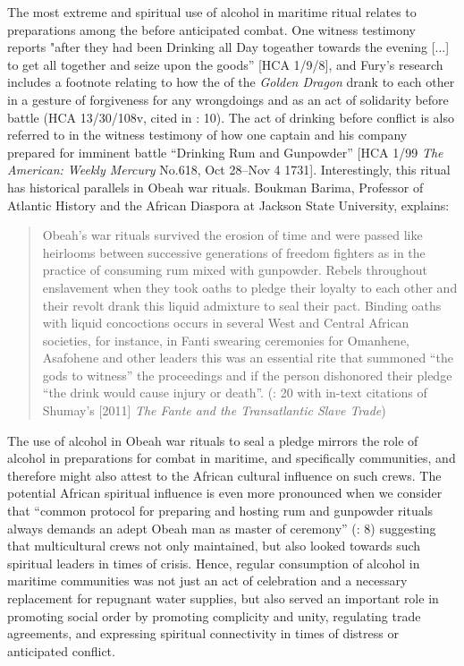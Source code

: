 The most extreme and spiritual use of alcohol in maritime ritual relates to preparations among the  before anticipated combat. One witness testimony reports "after they had been Drinking all Day togeather towards the evening [...] to get all together and seize upon the goods” [HCA 1/9/8], and Fury’s research includes a footnote relating to how the  of the \textit{Golden Dragon} drank to each other in a gesture of forgiveness for any wrongdoings and as an act of solidarity before battle (HCA 13/30/108v, cited in \citealt{Fury2015}: 10). The act of drinking before conflict is also referred to in the witness testimony of how one captain and his company prepared for imminent battle “Drinking Rum and Gunpowder” [HCA 1/99 \textit{The American: Weekly Mercury} No.618, Oct 28–Nov 4 1731]. Interestingly, this ritual has historical parallels in Obeah war rituals. Boukman Barima, Professor of Atlantic History and the African Diaspora at Jackson State University, explains:

\begin{quotation}
Obeah’s war rituals survived the erosion of time and were passed like heirlooms between successive generations of freedom fighters as in the practice of consuming rum mixed with gunpowder. Rebels throughout enslavement when they took oaths to pledge their loyalty to each other and their revolt drank this liquid admixture to seal their pact. Binding oaths with liquid concoctions occurs in several West and Central African societies, for instance, in Fanti swearing ceremonies for Omanhene, Asafohene and other leaders this was an essential rite that summoned “the gods to witness” the proceedings and if the person dishonored their pledge “the drink would cause injury or death”. (\citealt{BoukmanBarima2016}: 20 with in-text citations of Shumay’s [2011] \textit{The Fante and the Transatlantic Slave Trade})
\end{quotation}

The use of alcohol in Obeah war rituals to seal a pledge mirrors the role of alcohol in preparations for combat in maritime, and specifically  communities, and therefore might also attest to the African cultural influence on such crews. The potential African spiritual influence is even more pronounced when we consider that “common protocol for preparing and hosting rum and gunpowder rituals always demands an adept Obeah man as master of ceremony” (\citealt{BoukmanBarima2016}: 8) suggesting that multicultural crews not only maintained, but also looked towards such spiritual leaders in times of crisis. Hence, regular consumption of alcohol in maritime communities was not just an act of celebration and a necessary replacement for repugnant water supplies, but also served an important role in promoting social order by promoting complicity and unity, regulating trade agreements, and expressing spiritual connectivity in times of distress or anticipated conflict. 

